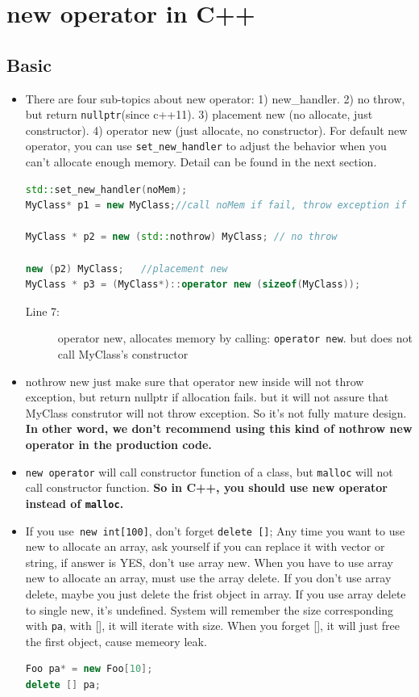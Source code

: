 \documentclass[a4paper,11pt,twoside]{book}
\begin{document}
\section{new operator in C++}
\subsection{Basic}
\begin{itemize}
	\item There are four sub-topics about new operator: 1) new\_handler. 2) no throw, but return \texttt{nullptr}(since c++11). 3) placement new (no allocate, just constructor). 4) operator new (just allocate, no constructor). For default new operator, you can use \texttt{set\_new\_handler} to adjust the behavior when you can't allocate enough memory. Detail can be found in the next section.
\begin{lstlisting}[frame=single, language=c++]
std::set_new_handler(noMem);
MyClass* p1 = new MyClass;//call noMem if fail, throw exception if no new handler

MyClass * p2 = new (std::nothrow) MyClass; // no throw

new (p2) MyClass;   //placement new
MyClass * p3 = (MyClass*)::operator new (sizeof(MyClass));	
\end{lstlisting}
\begin{description}
	\item[Line 7:] operator new, allocates memory by calling: \texttt{operator new}. but does not call MyClass's constructor
\end{description}	

	
	

	\item nothrow new just make sure that operator new inside will not throw exception, but return nullptr if allocation fails. but it will not assure that MyClass construtor will not throw exception. So it's not fully mature design. \textbf{In other word, we don't recommend using this kind of nothrow new operator in the production code.}

	\item \texttt{new operator} will call constructor function of a class, but \texttt{malloc} will not call constructor function.  \textbf{So in C++, you should use new operator instead of \texttt{malloc}.}
		
	\item If you use\texttt{ new int[100]}, don't forget \texttt{delete []};  Any time you want to use new to allocate an array, ask yourself if you can replace it with vector or string, if answer is YES, don't use array new. When you have to use array new to allocate an array, must use the array delete. If you don't use array delete, maybe you just delete the frist object in array. If you use array delete to single new, it's undefined. System will remember the size corresponding with \texttt{pa},  with [], it will iterate with size.  When you forget [], it will just free the first object, cause memeory leak.
\begin{lstlisting}[frame=single, language=c++]
Foo pa* = new Foo[10];
delete [] pa;
\end{lstlisting}	
	

\end{itemize}
\end{document}
